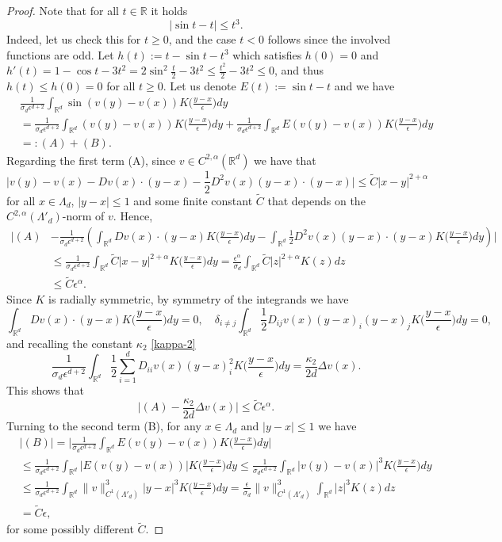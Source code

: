 \documentclass[a4paper,11pt]{amsart}
\newcommand{\B}{\mathbb{B}}
\newcommand{\R}{\mathbb{R}}
\newcommand{\ep}{\epsilon}
\numberwithin{equation}{section}
\numberwithin{theorem}{section}
\theoremstyle{definition}
\begin{document}
\begin{proof}
Note that for all $t\in\R$ it holds
\[
|\sin t-t|\le t^3.
\]
Indeed, let us check this for $t\ge0$, and the case $t<0$ follows since the involved functions are odd. Let $h(t):=t-\sin t-t^3$ which satisfies $h(0)=0$ and $h'(t)=1-\cos t-3t^2=2\sin^2\frac{t}{2}-3t^2\le \frac{t^2}{2}-3t^2\le 0$, and thus $h(t)\le h(0)=0$ for all $t\ge0$. Let us denote $E(t):=\sin t -t$ and we have
\begin{align*}
&\frac{1}{\sigma_d\ep^{d+2}}\int_{\R^d}\sin\left(v(y)-v(x)\right)K\Big(\frac{y-x}{\ep}\Big)dy \\
& 	= \frac{1}{\sigma_d\ep^{d+2}}\int_{\R^d}\left(v(y)-v(x)\right)K\Big(\frac{y-x}{\ep}\Big)dy +\frac{1}{\sigma_d\ep^{d+2}}\int_{\R^d}E\left(v(y)-v(x)\right)K\Big(\frac{y-x}{\ep}\Big)dy \\
& =: (A)+(B).
\end{align*}
Regarding the first term (A), since $v\in C^{2,\alpha}(\R^d)$ we have that
\[
\Big|v(y)-v(x)-D v(x)\cdot(y-x)-\frac{1}{2}D^2v(x)(y-x)\cdot(y-x)\Big|\le \tilde C|x-y|^{2+\alpha}
\]
for all $x\in\Lambda_d$, $|y-x|\le 1$ and some finite constant $\tilde C$ that depends on the $C^{2,\alpha}(\Lambda'_d)$-norm of $v$. Hence,
\begin{align*}
\Big|(A) & -\frac{1}{\sigma_d\ep^{d+2}}\left(\int_{\R^d}D v(x)\cdot(y-x)K\Big(\frac{y-x}{\ep}\Big)dy -\int_{\R^d}\frac{1}{2}D^2v(x)(y-x)\cdot(y-x)K\Big(\frac{y-x}{\ep}\Big)dy\right)\Big|\\
&\le \frac{1}{\sigma_d\ep^{d+2}}\int_{\R^d}\tilde C|x-y|^{2+\alpha}K\Big(\frac{y-x}{\ep}\Big)dy=\frac{\ep^\alpha}{\sigma_d}\int_{\R^d}\tilde C|z|^{2+\alpha}K(z)dz\\
&\le\tilde C\ep^\alpha.
\end{align*}
Since $K$ is radially symmetric, by symmetry of the integrands we have
\[
\int_{\R^d}D v(x)\cdot(y-x)K\Big(\frac{y-x}{\ep}\Big)dy=0, \quad \delta_{i\neq j}\int_{\R^d}\frac{1}{2}D_{ij}v(x)(y-x)_i(y-x)_jK\Big(\frac{y-x}{\ep}\Big)dy=0,
\]
and recalling the constant $\kappa_2$ \eqref{kappa-2} 
\[
\frac{1}{\sigma_d\ep^{d+2}}\int_{\R^d}\frac{1}{2}\sum_{i=1}^d D_{ii}v(x)(y-x)^2_i K\Big(\frac{y-x}{\ep}\Big)dy=\frac{\kappa_2}{2d}\Delta v(x).
\]
This shows that 
\[
\Big|(A)-\frac{\kappa_2}{2d}\Delta v(x)\Big|\le \tilde C\ep^\alpha.
\]
Turning to the second term (B), for any $x\in\Lambda_d$ and $|y-x|\le 1$ we have
\begin{align*}
   &|(B)|= \Big|\frac{1}{\sigma_d\ep^{d+2}}\int_{\R^d}E\left(v(y)-v(x)\right)K\Big(\frac{y-x}{\ep}\Big)dy \Big|\\
   &\le \frac{1}{\sigma_d\ep^{d+2}}\int_{\R^d}|E\left(v(y)-v(x)\right)|K\Big(\frac{y-x}{\ep}\Big)dy \le \frac{1}{\sigma_d\ep^{d+2}}\int_{\R^d}|v(y)-v(x)|^3K\Big(\frac{y-x}{\ep}\Big)dy\\
   &\le \frac{1}{\sigma_d\ep^{d+2}}\int_{\R^d}\|v\|_{C^1(\Lambda'_d)}^3|y-x|^3K\Big(\frac{y-x}{\ep}\Big)dy
   = \frac{\ep}{\sigma_d}\|v\|_{C^1(\Lambda'_d)}^3\int_{\R^d}|z|^3K(z)dz\\
   &=\tilde C \ep,
\end{align*}
for some possibly different $\tilde C$.
\end{proof}
\end{document}
